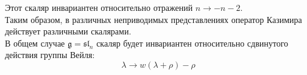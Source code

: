 \documentclass[12pt]{article}
\theoremstyle{definition}
\begin{document}
Этот скаляр инвариантен относительно отражений $n\rightarrow-n-2$.\\
Таким образом, в различных неприводимых представлениях оператор Казимира действует различными скалярами.\\
В общем случае $\mathfrak{g}=\mathfrak{sl}_n$ скаляр будет инвариантен относительно сдвинутого действия группы Вейля:
\begin{equation}
    \lambda\rightarrow w(\lambda+\rho)-\rho
\end{equation}
\end{document}
